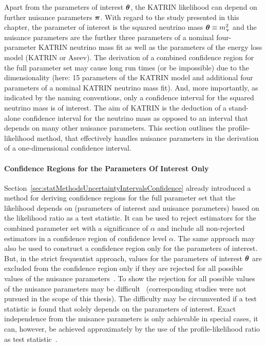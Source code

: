 Apart from the parameters of interest $\boldsymbol{\mathbf{\theta}}$, the KATRIN likelihood can depend on further nuisance parameters $\boldsymbol{\mathbf{\pi}}$. With regard to the study presented in this chapter, the parameter of interest is the squared neutrino mass $\boldsymbol{\mathbf{\theta}}\equiv m_\upnu^2$ and the nuisance parameters are the further three parameters of a nominal four-parameter KATRIN neutrino mass fit as well as the parameters of the energy loss model (KATRIN or Aseev). The derivation of a combined confidence region for the full parameter set may cause long run times (or be impossible) due to the dimensionality (here: 15 parameters of the KATRIN model and additional four parameters of a nominal KATRIN neutrino mass fit). And, more importantly, as indicated by the naming conventions, only a confidence interval for the squared neutrino mass is of interest. The aim of KATRIN is the deduction of a stand-alone confidence interval for the neutrino mass as opposed to an interval that depends on many other nuisance parameters. This section outlines the profile-likelihood method, that effectively handles nuisance parameters in the derivation of a one-dimensional confidence interval.

\paragraph{Confidence Regions for the Parameters Of Interest Only}
Section~\ref{sec:statMethodsUncertaintyIntervalsConfidence} already introduced a method for deriving confidence regions for the full parameter set that the likelihood depends on (parameters of interest and nuisance parameters) based on the likelihood ratio as a test statistic. It can be used to reject estimators for the combined parameter set with a significance of $\alpha$ and include all non-rejected estimators in a confidence region of confidence level $\alpha$. The same approach may also be used to construct a confidence region only for the parameters of interest. But, in the strict frequentist approach, values for the parameters of interest $\boldsymbol{\mathbf{\theta}}$ are excluded from the confidence region only if they are rejected for all possible values of the nuisance parameters~\cite{ReviewOfParticlePhysics}. To show the rejection for all possible values of the nuisance parameters may be difficult~\cite{ReviewOfParticlePhysics} (corresponding studies were not pursued in the scope of this thesis). The difficulty may be circumvented if a test statistic is found that solely depends on the parameters of interest. Exact independence from the nuisance parameters is only achievable in special cases, it can, however, be achieved approximately by the use of the profile-likelihood ratio as test statistic~\cite{ReviewOfParticlePhysics}.

